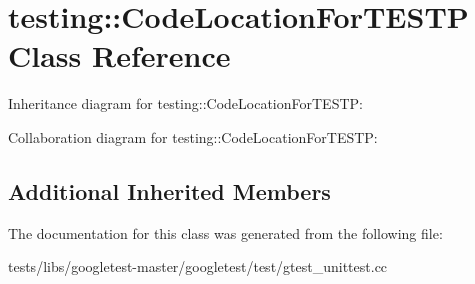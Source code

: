\hypertarget{classtesting_1_1CodeLocationForTESTP}{}\section{testing\+:\+:Code\+Location\+For\+T\+E\+S\+TP Class Reference}
\label{classtesting_1_1CodeLocationForTESTP}


Inheritance diagram for testing\+:\+:Code\+Location\+For\+T\+E\+S\+TP\+:


Collaboration diagram for testing\+:\+:Code\+Location\+For\+T\+E\+S\+TP\+:
\subsection*{Additional Inherited Members}


The documentation for this class was generated from the following file\+:\begin{DoxyCompactItemize}
\item 
tests/libs/googletest-\/master/googletest/test/gtest\+\_\+unittest.\+cc\end{DoxyCompactItemize}
